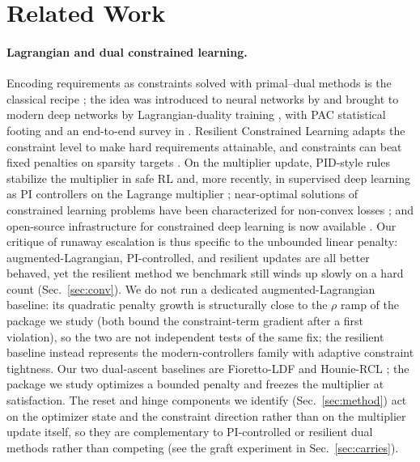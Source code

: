 \documentclass[10pt]{article}
\begin{document}
\section{Related Work}
\label{sec:related}

\paragraph{Lagrangian and dual constrained learning.}
Encoding requirements as constraints solved with primal--dual methods is the
classical recipe \citep{bertsekas1982constrained}; the idea was introduced to
neural networks by \citet{platt1988constrained} and brought to modern deep
networks by Lagrangian-duality training \citep{fioretto2020lagrangian}, with
PAC statistical footing \citep{chamon2020probably,chamon2022constrained} and
an end-to-end survey in \citet{kotary2021end}. Resilient Constrained Learning
\citep{hounie2023resilient} adapts the constraint level to make hard
requirements attainable, and constraints can beat fixed penalties on
sparsity targets \citep{gallego2022controlled}. On the multiplier update,
PID-style rules stabilize the multiplier in safe RL
\citep{stooke2020responsive} and, more recently, in supervised deep learning
as PI controllers on the Lagrange multiplier \citep{sohrabi2024pi};
near-optimal solutions of constrained learning problems have been
characterized for non-convex losses \citep{elenter2024near}; and open-source
infrastructure for constrained deep learning is now available
\citep{gallego2024cooper}. Our critique of runaway escalation is thus
specific to the unbounded linear penalty: augmented-Lagrangian, PI-controlled,
and resilient updates are all better behaved, yet the resilient method we
benchmark still winds up slowly on a hard count (Sec.~\ref{sec:conv}). We
do not run a dedicated augmented-Lagrangian baseline: its quadratic penalty
growth is structurally close to the $\rho$ ramp of the package we study
(both bound the constraint-term gradient after a first violation), so the
two are not independent tests of the same fix; the resilient baseline
instead represents the modern-controllers family with adaptive constraint
tightness. Our
two dual-ascent baselines are Fioretto-LDF \citep{fioretto2020lagrangian} and
Hounie-RCL \citep{hounie2023resilient}; the package we study optimizes a
bounded penalty and freezes the multiplier at satisfaction. The reset and
hinge components we identify (Sec.~\ref{sec:method}) act on the optimizer
state and the constraint direction rather than on the multiplier update
itself, so they are complementary to PI-controlled or resilient dual methods
rather than competing (see the graft experiment in Sec.~\ref{sec:carries}).
\end{document}
